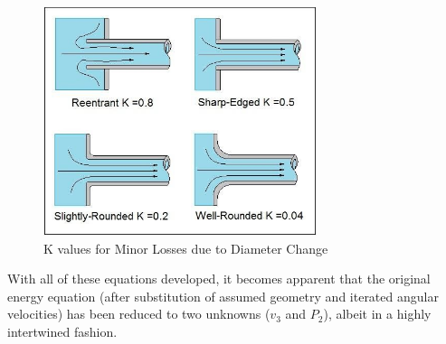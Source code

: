 \documentclass{report}
\begin{document}
\begin{figure}[h]
\centering
\includegraphics[width=8cm]{"Nozzel Minor Losses"}
\caption{K values for Minor Losses due to Diameter Change}
\end{figure}
With all of these equations developed, it becomes apparent that the original energy equation (after substitution of assumed geometry and iterated angular velocities) has been reduced to two unknowns ($v_3$ and $P_2$), albeit in a highly intertwined fashion.
\end{document}

